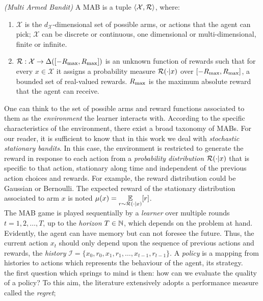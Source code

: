 \begin{definition} \emph{(Multi Armed Bandit)}
A \gls{MAB} is a tuple $\langle\mathcal{X}, \mathcal{R}\rangle$, where:
\begin{enumerate}
\item $\mathcal{X}$ is the $d_{\mathcal{X}}$-dimensional set of possible arms, or actions that the agent can pick; $\mathcal{X}$ can be discrete or continuous, one dimensional or multi-dimensional, finite or infinite.
\item $\mathcal{R}:\mathcal{X}\to\Delta([-R_{\max},R_{\max}])$ is an unknown function of rewards such that for every $x\in\mathcal{X}$ it assigns a probability measure $\mathcal{R}(\cdot|x)$ over $[-R_{\max},R_{\max}]$, a bounded set of real-valued rewards. $R_{\max}$ is the maximum absolute reward that the agent can receive.
\end{enumerate}
\end{definition}

One can think to the set of possible arms and reward functions associated to them as the \emph{environment} the learner interacts with. According to the specific characteristics of the environment, there exist a broad taxonomy of \gls{MAB}s. For our reader, it is sufficient to know that in this work we deal with \emph{stochastic stationary bandits}. In this case, the environment is restricted to generate the reward in response to each action from a \emph{probability distribution} $\mathcal{R}(\cdot|x)$ that is specific to that action, stationary along time and independent of the previous action choices and rewards. For example, the reward distribution could be Gaussian or Bernoulli. The expected reward of the stationary distribution associated to arm $x$ is noted $\mu(x) = \underset{r\sim\mathcal{R}(\cdot|x)}{\mathbb{E}}[r]$. \\
The \gls{MAB} game is played sequentially by a \emph{learner} over multiple rounds $t=1, 2, \dots, T$, up to the \emph{horizon} $T\in\mathbb{N}$, which depends on the problem at hand. Evidently, the agent can have memory but can not foresee the future. Thus, the current action $x_t$ should only depend upon the sequence of previous actions and rewards, the \emph{history} $\mathcal{I} = \{x_0, r_0, x_1, r_1, \dots, x_{t-1}, r_{t-1}\}$. A \emph{policy} is a mapping from histories to actions which represents the behaviour of the agent, its strategy. \\
the first question which springs to mind is then: how can we evaluate the quality of a policy? To this aim, the literature extensively adopts a performance measure called the \emph{regret};

